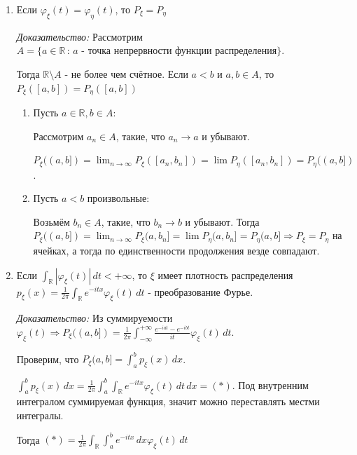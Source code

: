 \begin{consequence}
    \begin{enumerate}
        \item {
            Если $\varphi_{\xi}(t) = \varphi_{\eta}(t)$, то $P_{\xi} = P_\eta$

            \textit{Доказательство: } Рассмотрим $A = \{ a \in \mathbb{R} \, : \, \text{$a$ - точка непрервности функции распределения} \}$. 
            
            Тогда $\mathbb{R} \setminus A$ - не более чем счётное. 
            Если $a < b$ и $a, b \in A$, то $P_{\xi} ([a, b]) = P_\eta ([a, b])$

            \begin{enumerate}
                \item {
                    Пусть $a \in \mathbb{R}, b \in A$:
            
                    Рассмотрим $a_n \in A$, такие, что $a_n \to a$ и убывают.

                    $P_{\xi} ((a, b]) = \lim_{n \to \infty} P_{\xi} ([a_n, b_n]) = \lim P_{\eta} ([a_n, b_n]) = P_\eta ((a, b])$.
                }
                \item {
                    Пусть $a < b$ произвольные:
                    
                    Возьмём $b_n \in A$, такие, что $b_n \to b$ и убывают. Тогда $P_{\xi} ((a, b]) = \lim_{n \to \infty} P_{\xi} (a, b_n] = \lim P_\eta (a, b_n] = P_\eta (a, b] \Rightarrow 
                    P_\xi = P_\eta$ на ячейках, а тогда по единственности продолжения везде совпадают.
                }
            \end{enumerate}
        }

        \item {
            Если $\int_{\mathbb{R}} |\varphi_\xi (t) | \, dt < +\infty$, то $\xi$ имеет плотность распределения
            $p_{\xi} (x) = \frac{1}{2\pi} \int_{\mathbb{R}} e^{-itx} \varphi_{\xi} (t) \, dt$ - преобразование Фурье.

            \textit{Доказательство: } Из суммируемости $\varphi_\xi (t) \Rightarrow P_{\xi} ((a, b]) = \frac{1}{2\pi} \int_{-\infty}^{+\infty} \frac{e^{-iat} - e^{-ibt}}{it} \varphi_{\xi} (t) \, dt$. 

            Проверим, что $P_{\xi} (a, b] = \int_a^b p_{\xi} (x) \, dx$.

            $\int_a^b p_{\xi} (x) \, dx = \frac{1}{2\pi} \int_a^b \int_{\mathbb{R}} e^{-itx} \varphi_\xi (t) \, dt \, dx = (*)$. Под внутренним интегралом суммируемая функция, значит можно переставлять местми интегралы.

            Тогда $(*) = \frac{1}{2\pi} \int_{\mathbb{R}} \int_a^b e^{-itx} \, dx \varphi_\xi (t) \, dt$
        }
    \end{enumerate}
\end{consequence}

